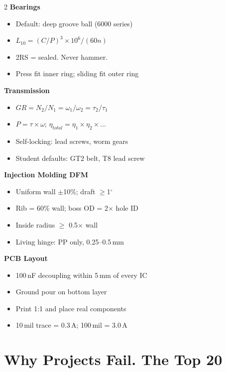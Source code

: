 \documentclass[11pt,letterpaper,twoside,openany]{book}
\providecommand{\ang}[1]{#1\ensuremath{{}^{\circ}}}
\begin{document}
\begin{multicols}{2}
\textbf{Bearings}
\begin{itemize}[nosep,leftmargin=1em]
\item Default: deep groove ball (6000 series)
\item $L_{10} = (C/P)^3 \times 10^6/(60n)$
\item 2RS = sealed. Never hammer.
\item Press fit inner ring; sliding fit outer ring
\end{itemize}

\textbf{Transmission}
\begin{itemize}[nosep,leftmargin=1em]
\item $GR = N_2/N_1 = \omega_1/\omega_2 = \tau_2/\tau_1$
\item $P = \tau \times \omega$; $\eta_{total} = \eta_1 \times \eta_2 \times ...$
\item Self-locking: lead screws, worm gears
\item Student defaults: GT2 belt, T8 lead screw
\end{itemize}

\textbf{Injection Molding DFM}
\begin{itemize}[nosep,leftmargin=1em]
\item Uniform wall $\pm$10\%; draft $\geq$\ang{1}
\item Rib = 60\% wall; boss OD = 2$\times$ hole ID
\item Inside radius $\geq$ 0.5$\times$ wall
\item Living hinge: PP only, 0.25--0.5\,mm
\end{itemize}

\textbf{PCB Layout}
\begin{itemize}[nosep,leftmargin=1em]
\item 100\,nF decoupling within 5\,mm of every IC
\item Ground pour on bottom layer
\item Print 1:1 and place real components
\item 10\,mil trace = 0.3\,A; 100\,mil = 3.0\,A
\end{itemize}
\end{multicols}

\chapter*{Why Projects Fail. The Top 20}
\end{document}
